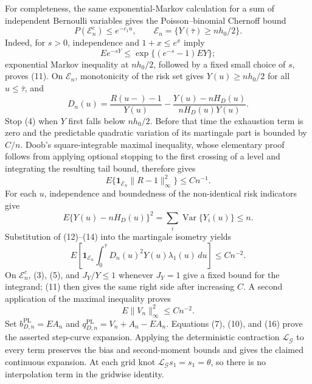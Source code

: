 For completeness, the same exponential-Markov calculation for a sum of
independent Bernoulli variables gives the Poisson--binomial Chernoff bound
\[
 P(\mathcal E_n^c)\le e^{-c_1n},
 \qquad
 \mathcal E_n=\{Y(\bar\tau)\ge nh_0/2\}.                  \tag{11}
\]
Indeed, for \(s>0\), independence and \(1+x\le e^x\) imply
\[
 E e^{-sY}\le
 \exp\{(e^{-s}-1)EY\};
\]
exponential Markov inequality at \(nh_0/2\), followed by a fixed small
choice of \(s\), proves (11).  On \(\mathcal E_n\), monotonicity of the
risk set gives \(Y(u)\ge nh_0/2\) for all \(u\le\bar\tau\), and
\[
 D_n(u)=\frac{R(u-)-1}{Y(u)}
 -\frac{Y(u)-nH_D(u)}{nH_D(u)Y(u)}.                         \tag{12}
\]
Stop (4) when \(Y\) first falls below \(nh_0/2\).  Before that time the
exhaustion term is zero and the predictable quadratic variation of its
martingale part is bounded by \(C/n\).  Doob's square-integrable maximal
inequality, whose elementary proof follows from applying optional stopping
to the first crossing of a level and integrating the resulting tail bound,
therefore gives
\[
 E\{\mathbf1_{\mathcal E_n}\|R-1\|_\infty^2\}\le Cn^{-1}.
                                                                    \tag{13}
\]
For each \(u\), independence and boundedness of the non-identical risk
indicators give
\[
 E\{Y(u)-nH_D(u)\}^2
 =\sum_i\operatorname{Var}\{Y_i(u)\}\le n.                \tag{14}
\]
Substitution of (12)--(14) into the martingale isometry yields
\[
 E\left[\mathbf1_{\mathcal E_n}
   \int_0^{\bar\tau}D_n(u)^2Y(u)\lambda_1(u)\,du\right]
 \le Cn^{-2}.                                               \tag{15}
\]
On \(\mathcal E_n^c\), (3), (5), and \(J_Y/Y\le1\) whenever
\(J_Y=1\) give a fixed bound for the integrand; (11) then gives the same
right side after increasing \(C\).  A second application of the maximal
inequality proves
\[
 E\|V_n\|_\infty^2\le Cn^{-2}.                             \tag{16}
\]
Set \(b_{D,n}^{\mathrm{PL}}=EA_n\) and
\(q_{D,n}^{\mathrm{PL}}=V_n+A_n-EA_n\).  Equations
(7), (10), and (16) prove the asserted step-curve expansion.  Applying the
deterministic contraction \(\mathcal L_{\mathcal G}\) to every term
preserves the bias and second-moment bounds and gives the claimed continuous
expansion.  At each grid knot \(\mathcal L_{\mathcal G}s_1=s_1=\theta\),
so there is no interpolation term in the gridwise identity.

